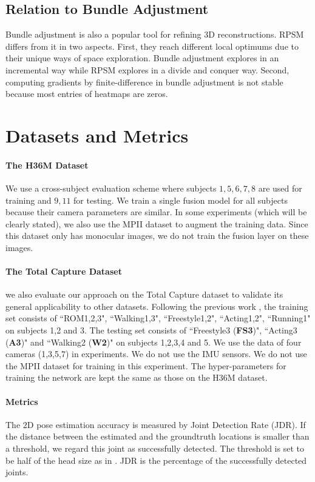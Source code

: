 \documentclass[10pt,twocolumn,letterpaper]{article}
\begin{document}
\subsection{Relation to Bundle Adjustment \cite{triggs1999bundle}}
Bundle adjustment \cite{triggs1999bundle} is also a popular tool for refining $3$D reconstructions. RPSM differs from it in two aspects. First, they reach different local optimums due to their unique ways of space exploration. Bundle adjustment explores in an incremental way while RPSM explores in a divide and conquer way. Second, computing gradients by finite-difference in bundle adjustment is not stable because most entries of heatmaps are zeros.


\section{Datasets and Metrics}
\paragraph{The H36M Dataset \cite{ionescu2014human3}} We use a cross-subject evaluation scheme where subjects $1,5,6,7,8$ are used for training and $9,11$ for testing. We train a single fusion model for all subjects because their camera parameters are similar. In some experiments (which will be clearly stated), we also use the MPII dataset \cite{andriluka20142D} to augment the training data. Since this dataset only has monocular images, we do not train the fusion layer on these images. 

\paragraph{The Total Capture Dataset \cite{trumble2017total}} we also evaluate our approach on the Total Capture dataset to validate its general applicability to other datasets. Following the previous work \cite{trumble2017total}, the training set consists of ``ROM1,2,3", ``Walking1,3", ``Freestyle1,2", ``Acting1,2", ``Running1" on subjects 1,2 and 3. The testing set consists of ``Freestyle3 (\textbf{FS3})", ``Acting3 (\textbf{A3})" and ``Walking2 (\textbf{W2})" on subjects 1,2,3,4 and 5. We use the data of four cameras (1,3,5,7) in experiments.  We do not use the IMU sensors. We do not use the MPII dataset for training in this experiment. The hyper-parameters for training the network are kept the same as those on the H36M dataset.


\paragraph{Metrics} The $2$D pose estimation accuracy is measured by Joint Detection Rate (JDR). If the distance between the estimated and the groundtruth locations is smaller than a threshold, we regard this joint as successfully detected. The threshold is set to be half of the head size as in \cite{andriluka20142D}. JDR is the percentage of the successfully detected joints.
\end{document}
